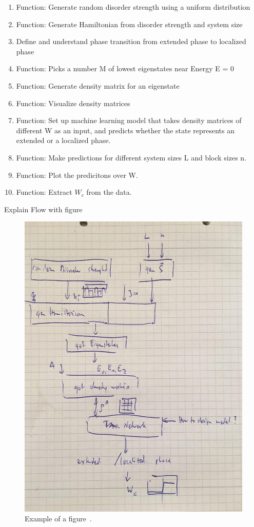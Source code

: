 \documentclass[reprint,amsmath,amssymb,aps,prb]{revtex4-2}
\begin{document}
\begin{enumerate}
	\item Function: Generate random disorder strength using a uniform distribution
	\item Function: Generate Hamiltonian from disorder strength and system size
	\item Define and understand phase transition from extended phase to localized phase
	\item Function: Picks a number M of lowest eigenstates near Energy E = 0
	\item Function: Generate density matrix for an eigenstate
	\item Function: Visualize density matrices
	\item  Function: Set up machine learning model that takes density matrices of different W as an input, 
	and predicts whether the state represents an extended or a localized phase.
	\item Function: Make predictions for different system sizes L and block sizes n.
	\item Function: Plot the predicitons over W.
	\item Function: Extract $W_c$
	from the data.
\end{enumerate}


Explain Flow with figure

\begin{figure}[h!]
	\includegraphics[width=0.99\linewidth]{figures/flowchart.jpg}
	\caption{Example of a figure~\cite{Orus2013}.}
	\label{fig:example}
\end{figure}
\end{document}
